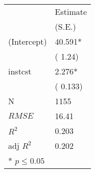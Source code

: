 \begin{center}
 \begin{tabular}{*{2}{l}}
 \hline
               & Estimate  \\
              & (S.E.)  \\
\hline 
 \hline
  (Intercept)   &    40.591* \\
    &   ( 1.24) \\
  instcst   &    2.276* \\
    &   ( 0.133) \\
 \hline 
N   &    1155 \\
 $RMSE$       & 16.41  \\
 $R^2$       & 0.203  \\
 adj $R^2$       & 0.202  \\
 \hline\hline
* $p \le 0.05$\end{tabular}
\end{center}